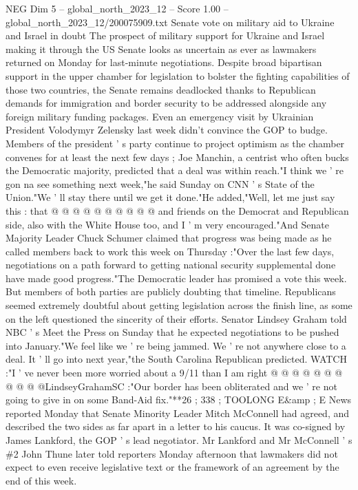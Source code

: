 \begin{textsample}{NEG Dim 5 – global\_north\_2023\_12 – Score 1.00 – global\_north\_2023\_12/200075909.txt}  \label{ex:f5_neg_060}
Senate vote on military aid to Ukraine and Israel in doubt The prospect of military support for Ukraine and Israel making it through the US Senate looks as uncertain as ever as lawmakers returned on Monday for last-minute negotiations.
Despite broad bipartisan support in the upper chamber for legislation to bolster the fighting capabilities of those two countries, the Senate remains deadlocked thanks to Republican demands for immigration and border security to be addressed alongside any foreign military funding packages.
Even an emergency visit by Ukrainian President Volodymyr Zelensky last week didn't convince the GOP to budge.
Members of the president ' s party continue to project optimism as the chamber convenes for at least the next few days ; Joe Manchin, a centrist who often bucks the Democratic majority, predicted that a deal was within reach."I think we ' re gon na see something next week,"he said Sunday on CNN ' s State of the Union."We ' ll stay there until we get it done."He added,"Well, let me just say this : that @ @ @ @ @ @ @ @ @ @ and friends on the Democrat and Republican side, also with the White House too, and I ' m very encouraged."And Senate Majority Leader Chuck Schumer claimed that progress was being made as he called members back to work this week on Thursday :"Over the last few days, negotiations on a path forward to getting national security supplemental done have made good progress."The Democratic leader has promised a vote this week.
But members of both parties are publicly doubting that timeline.
Republicans seemed extremely doubtful about getting legislation across the finish line, as some on the left questioned the sincerity of their efforts.
Senator Lindsey Graham told NBC ' s Meet the Press on Sunday that he expected negotiations to be pushed into January."We feel like we ' re being jammed.
We ' re not anywhere close to a deal.
It ' ll go into next year,"the South Carolina Republican predicted.
WATCH :"I ' ve never been more worried about a 9/11 than I am right @ @ @ @ @ @ @ @ @ @ @LindseyGrahamSC :"Our border has been obliterated and we ' re not going to give in on some Band-Aid fix."**26 ; 338 ; TOOLONG E\&amp ; E News reported Monday that Senate Minority Leader Mitch McConnell had agreed, and described the two sides as far apart in a letter to his caucus.
It was co-signed by James Lankford, the GOP ' s lead negotiator.
Mr Lankford and Mr McConnell ' s \#2 John Thune later told reporters Monday afternoon that lawmakers did not expect to even receive legislative text or the framework of an agreement by the end of this week.

\end{textsample}
